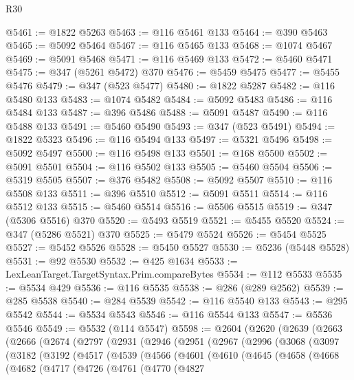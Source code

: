 \begin{lexlean}{R30}
\begin{coremodule}
@5461 := @1822 @5263
@5463 := @116 @5461 @133
@5464 := @390 @5463
@5465 := @5092 @5464
@5467 := @116 @5465 @133
@5468 := @1074 @5467
@5469 := @5091 @5468
@5471 := @116 @5469 @133
@5472 := @5460 @5471
@5475 := @347 (@5261 @5472) @370
@5476 := @5459 @5475
@5477 := @5455 @5476
@5479 := @347 (@523 @5477)
@5480 := @1822 @5287
@5482 := @116 @5480 @133
@5483 := @1074 @5482
@5484 := @5092 @5483
@5486 := @116 @5484 @133
@5487 := @396 @5486
@5488 := @5091 @5487
@5490 := @116 @5488 @133
@5491 := @5460 @5490
@5493 := @347 (@523 @5491)
@5494 := @1822 @5323
@5496 := @116 @5494 @133
@5497 := @5321 @5496
@5498 := @5092 @5497
@5500 := @116 @5498 @133
@5501 := @168 @5500
@5502 := @5091 @5501
@5504 := @116 @5502 @133
@5505 := @5460 @5504
@5506 := @5319 @5505
@5507 := @376 @5482
@5508 := @5092 @5507
@5510 := @116 @5508 @133
@5511 := @396 @5510
@5512 := @5091 @5511
@5514 := @116 @5512 @133
@5515 := @5460 @5514
@5516 := @5506 @5515
@5519 := @347 (@5306 @5516) @370
@5520 := @5493 @5519
@5521 := @5455 @5520
@5524 := @347 (@5286 @5521) @370
@5525 := @5479 @5524
@5526 := @5454 @5525
@5527 := @5452 @5526
@5528 := @5450 @5527
@5530 := @5236 (@5448 @5528)
@5531 := @92 @5530
@5532 := @425 @1634
@5533 := LexLeanTarget.TargetSyntax.Prim.compareBytes
@5534 := @112 @5533
@5535 := @5534 @429
@5536 := @116 @5535
@5538 := @286 (@289 @2562)
@5539 := @285 @5538
@5540 := @284 @5539
@5542 := @116 @5540 @133
@5543 := @295 @5542
@5544 := @5534 @5543
@5546 := @116 @5544 @133
@5547 := @5536 @5546
@5549 := @5532 (@114 @5547)
@5598 := @2604
    (@2620
      (@2639
        (@2663
          (@2666
            (@2674
              (@2797
                (@2931
                  (@2946
                    (@2951
                      (@2967
                        (@2996
                          (@3068
                            (@3097
                              (@3182
                                (@3192
                                  (@4517
                                    (@4539
                                      (@4566
                                        (@4601
                                          (@4610
                                            (@4645
                                              (@4658
                                                (@4668
                                                  (@4682
                                                    (@4717
                                                      (@4726
                                                        (@4761
                                                          (@4770
                                                            (@4827

\end{coremodule}
\end{lexlean}
